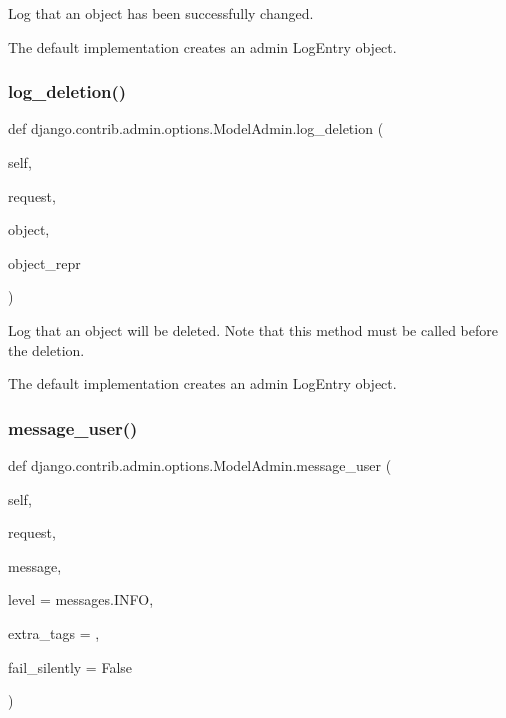 \begin{DoxyVerb}Log that an object has been successfully changed.

The default implementation creates an admin LogEntry object.
\end{DoxyVerb}
 \mbox{\label{classdjango_1_1contrib_1_1admin_1_1options_1_1_model_admin_a26c8bf3c50ec451ffc671755c4626968}} 
\subsubsection{\texorpdfstring{log\+\_\+deletion()}{log\_deletion()}}
{\footnotesize\ttfamily def django.\+contrib.\+admin.\+options.\+Model\+Admin.\+log\+\_\+deletion (\begin{DoxyParamCaption}\item[{}]{self,  }\item[{}]{request,  }\item[{}]{object,  }\item[{}]{object\+\_\+repr }\end{DoxyParamCaption})}

\begin{DoxyVerb}Log that an object will be deleted. Note that this method must be
called before the deletion.

The default implementation creates an admin LogEntry object.
\end{DoxyVerb}
 \mbox{\label{classdjango_1_1contrib_1_1admin_1_1options_1_1_model_admin_a7f79d20a4e8dbea317c386e068e60f10}} 
\subsubsection{\texorpdfstring{message\+\_\+user()}{message\_user()}}
{\footnotesize\ttfamily def django.\+contrib.\+admin.\+options.\+Model\+Admin.\+message\+\_\+user (\begin{DoxyParamCaption}\item[{}]{self,  }\item[{}]{request,  }\item[{}]{message,  }\item[{}]{level = {\ttfamily messages.INFO},  }\item[{}]{extra\+\_\+tags = {\ttfamily \textquotesingle{}\textquotesingle{}},  }\item[{}]{fail\+\_\+silently = {\ttfamily False} }\end{DoxyParamCaption})}

